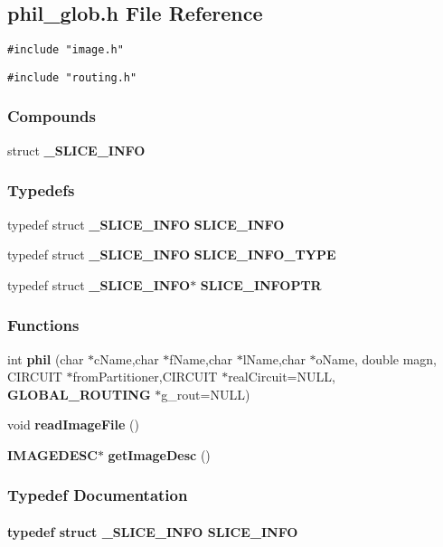 \subsection{phil\_\-glob.h File Reference}
\label{phil_glob.h}
{\tt \#include "image.h"}\par
{\tt \#include "routing.h"}\par
\subsubsection*{Compounds}
\begin{CompactItemize}
\item 
struct {\bf \_\-SLICE\_\-INFO}
\end{CompactItemize}
\subsubsection*{Typedefs}
\begin{CompactItemize}
\item 
typedef struct {\bf \_\-SLICE\_\-INFO} {\bf SLICE\_\-INFO}
\item 
typedef struct {\bf \_\-SLICE\_\-INFO} {\bf SLICE\_\-INFO\_\-TYPE}
\item 
typedef struct {\bf \_\-SLICE\_\-INFO}$\ast$ {\bf SLICE\_\-INFOPTR}
\end{CompactItemize}
\subsubsection*{Functions}
\begin{CompactItemize}
\item 
int {\bf phil} (char $\ast$c\-Name,char $\ast$f\-Name,char $\ast$l\-Name,char $\ast$o\-Name, double magn, CIRCUIT $\ast$from\-Partitioner,CIRCUIT $\ast$real\-Circuit=NULL, {\bf GLOBAL\_\-ROUTING} $\ast$g\_\-rout=NULL)
\item 
void {\bf read\-Image\-File} ()
\item 
{\bf IMAGEDESC}$\ast$ {\bf get\-Image\-Desc} ()
\end{CompactItemize}


\subsubsection{Typedef Documentation}
\label{phil_glob.h_a3}
\paragraph{\setlength{\rightskip}{0pt plus 5cm}typedef struct {\bf \_\-SLICE\_\-INFO} SLICE\_\-INFO}\hfill

